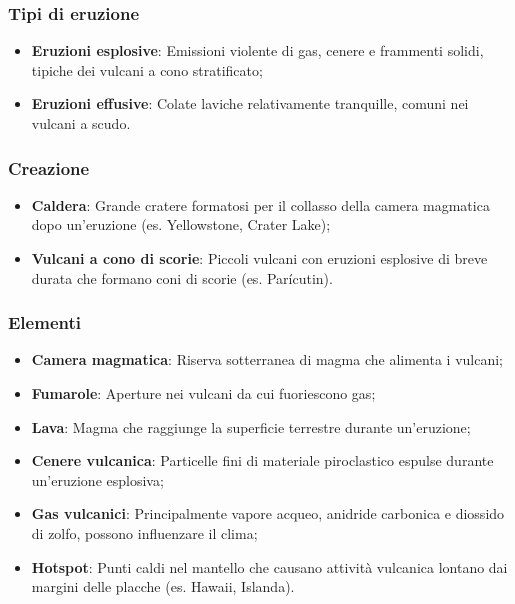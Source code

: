 \documentclass{article}
\begin{document}
\subsubsection{Tipi di eruzione}
\begin{itemize}
    \item \textbf{Eruzioni esplosive}: Emissioni violente di gas, cenere e frammenti solidi,
        tipiche dei vulcani a cono stratificato;
    \item \textbf{Eruzioni effusive}: Colate laviche relativamente tranquille, comuni nei
        vulcani a scudo.
\end{itemize}
    
\subsubsection{Creazione}
\begin{itemize}
    \item \textbf{Caldera}: Grande cratere formatosi per il collasso della camera magmatica dopo
        un'eruzione (es. Yellowstone, Crater Lake);
    \item \textbf{Vulcani a cono di scorie}: Piccoli vulcani con eruzioni esplosive di breve
        durata che formano coni di scorie (es. Parícutin).
\end{itemize}
    
\subsubsection{Elementi}
\begin{itemize}
    \item \textbf{Camera magmatica}: Riserva sotterranea di magma che alimenta i vulcani;
    \item \textbf{Fumarole}: Aperture nei vulcani da cui fuoriescono gas;
    \item \textbf{Lava}: Magma che raggiunge la superficie terrestre durante un'eruzione;
    \item \textbf{Cenere vulcanica}: Particelle fini di materiale piroclastico espulse durante
        un'eruzione esplosiva;
    \item \textbf{Gas vulcanici}: Principalmente vapore acqueo, anidride carbonica e diossido
        di zolfo, possono influenzare il clima;
    \item \textbf{Hotspot}: Punti caldi nel mantello che causano attività vulcanica lontano dai
        margini delle placche (es. Hawaii, Islanda).
\end{itemize}
    
\end{document}
